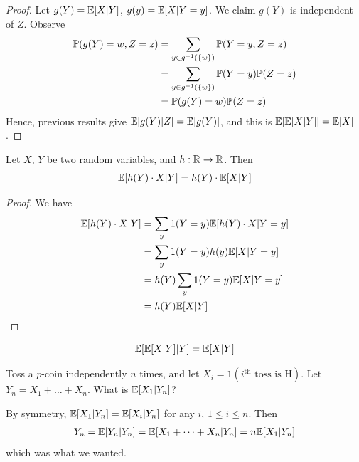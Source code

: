 \documentclass{../template/note}
\begin{document}
    \begin{proof}
        Let \(g(Y) = \mathbb E[X | Y]\), \(g(y) = \mathbb E[X | Y = y]\). We claim \(g(Y)\) is independent of \(Z\). Observe
        \begin{align*}
            \mathbb P(g(Y) = w, Z = z) &= \sum_{y \in g^{-1}(\{w\})} \mathbb P(Y = y, Z = z) \\
            &= \sum_{y \in g^{-1}(\{w\})} \mathbb P(Y = y) \mathbb P(Z = z) \\
            &= \mathbb P(g(Y) = w) \mathbb P(Z = z)
        \end{align*}
        Hence, previous results give \(\mathbb E[g(Y) | Z] = \mathbb E[g(Y)]\), and this is \(\mathbb E[\mathbb E[X | Y]] = \mathbb E[X]\).        
    \end{proof}
    
    \begin{proposition}
        Let \(X\), \(Y\) be two random variables, and \(h: \mathbb R \to \mathbb R\). Then
        \begin{align*}
            \mathbb E[h(Y) \cdot X | Y] = h(Y) \cdot \mathbb E[X | Y]
        \end{align*}
    \end{proposition}
    
    \begin{proof}
        We have
        \begin{align*}
            \mathbb E[h(Y) \cdot X | Y] &= \sum_y 1(Y = y) \mathbb E[h(Y) \cdot X | Y = y] \\
            &= \sum_y 1(Y = y) h(y) \mathbb E[X | Y = y] \\
            &= h(Y) \sum_y 1(Y = y) \mathbb E[X | Y = y] \\
            &= h(Y) \mathbb E[X | Y]
        \end{align*}
    \end{proof}
    
    \begin{corollary}
        \[\mathbb E[\mathbb E[X | Y] | Y] = \mathbb E[X | Y]\]
    \end{corollary}
    
    \begin{example*}
        Toss a \(p\)-coin independently \(n\) times, and let \(X_i = 1(i^\text{th} \text{ toss is H})\). Let \(Y_n = X_1 + \dots + X_n\). What is \(\mathbb E[X_1 | Y_n]\)?

        By symmetry, \(\mathbb E[X_1 | Y_n] = \mathbb E[X_i | Y_n]\) for any \(i\), \(1 \leq i \leq n\). Then
        \begin{align*}
            Y_n = \mathbb E[Y_n | Y_n] = \mathbb E[X_1 + \dots + X_n | Y_n] = n \mathbb E[X_1 | Y_n] 
        \end{align*}
        which was what we wanted.
    \end{example*}
    
\end{document}
